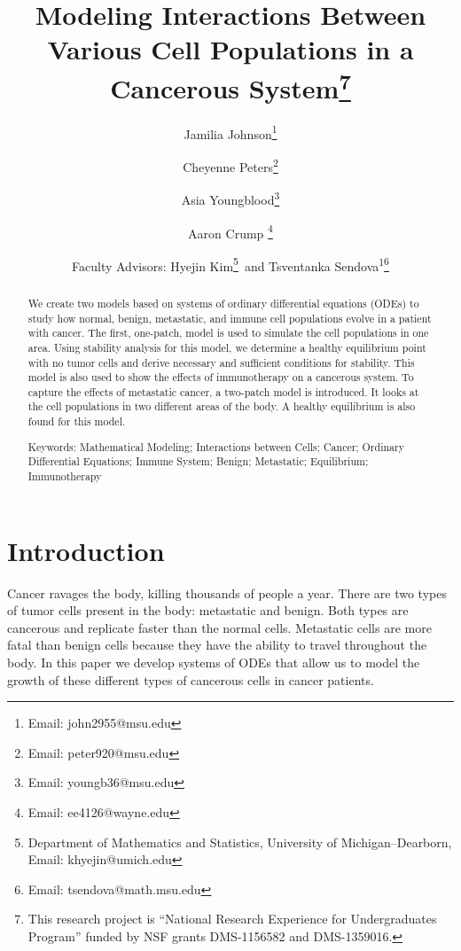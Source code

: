 \documentclass[letter,10pt]{article}
\begin{document}
\newtheorem{theorem}{Theorem}
\newtheorem{definition}{Definition}
\newtheorem{lemma}{Lemma}
\newtheorem{proposition}{Proposition}
\newtheorem{corollary}{Corollary}


\title{Modeling Interactions Between Various Cell Populations in a Cancerous System\footnote{This research project is ``National Research Experience for Undergraduates Program'' funded by NSF grants DMS-1156582 and DMS-1359016.}}
\author[1]{Jamilia Johnson\thanks{Email: john2955@msu.edu}}
\author[1]{Cheyenne Peters\thanks{Email: peter920@msu.edu}}
\author[1]{Asia Youngblood\thanks{Email: youngb36@msu.edu}}
\author[2]{Aaron Crump \thanks{Email: ee4126@wayne.edu}}

\date{Faculty Advisors: Hyejin Kim\footnote{Department of Mathematics and Statistics, University of Michigan--Dearborn, Email: khyejin@umich.edu}\, and Tsventanka Sendova\textsuperscript{1}\footnote{Email: tsendova@math.msu.edu}}


\maketitle



\begin{abstract}
We create two models based on systems of  ordinary differential equations (ODEs)  to study how normal, benign, metastatic, and immune cell populations evolve in a patient with cancer. The first, one-patch, model is used to simulate the cell populations in one area. Using stability analysis for this model, we determine a healthy equilibrium point with no tumor cells and derive necessary and sufficient conditions for stability. This model is also used to show the effects of immunotherapy on a cancerous system. To capture the effects of metastatic cancer, a two-patch model  is introduced. It looks at the cell populations in two different areas of the body.  A healthy equilibrium is also found for this model. 

{\flushleft \scriptsize Keywords: Mathematical Modeling; Interactions between Cells; Cancer; Ordinary Differential Equations; Immune System; Benign; Metastatic; Equilibrium; Immunotherapy}

\end{abstract}


\section{Introduction}
Cancer ravages the body, killing thousands of people a year. There are two types of tumor cells present in the body: metastatic and benign. Both types are cancerous and replicate faster than the normal cells. Metastatic cells are more fatal than benign cells because they have the ability to travel throughout the body. In this paper we develop systems of ODEs that allow us to model the growth of these different types of cancerous cells in cancer patients.
\end{document}
